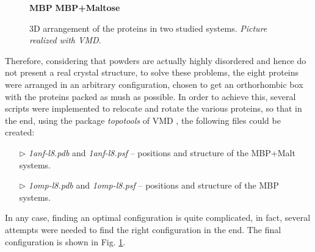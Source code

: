\begin{itemize}
\begin{figure}[h]
\begin{center}
\hspace{1.5cm}
\textbf{MBP}
\hspace{4.75cm}
\textbf{MBP+Maltose}

    \footnotesize{\caption{3D arrangement of the proteins in two studied systems. \textit{Picture realized with VMD.}}
    \label{fig:protein-box}
    }
\end{center}
\end{figure}

Therefore, considering that powders are actually highly disordered and hence do not present a real crystal structure, to solve these problems, the eight proteins were arranged in an arbitrary configuration, chosen to get an orthorhombic box with the proteins packed as mush as possible. In order to achieve this, several scripts were implemented to relocate and rotate the various proteins, so that in the end, using the package \textit{topotools} of VMD \cite{vmd-topotools}, the following files could be created:
\begin{itemize}
\item[$\triangleright$] \textit{1anf-l8.pdb} and \textit{1anf-l8.psf} -- positions and structure of the MBP+Malt systems.
\item[$\triangleright$] \textit{1omp-l8.pdb} and \textit{1omp-l8.psf} -- positions and structure of the MBP systems.
\end{itemize}
In any case, finding an optimal configuration is quite complicated, in fact, several attempts were needed to find the right configuration in the end. The final configuration is shown in Fig. \ref{fig:protein-box}.


\end{itemize}
